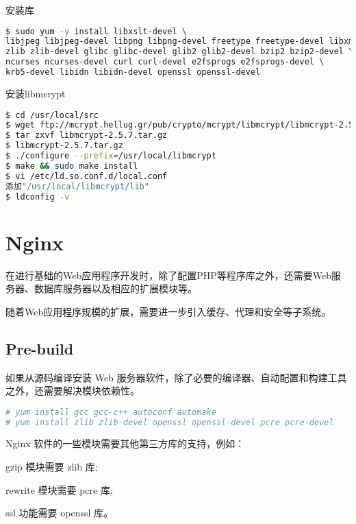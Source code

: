 安装库


\begin{lstlisting}[language=bash]
$ sudo yum -y install libxslt-devel \
libjpeg libjpeg-devel libpng libpng-devel freetype freetype-devel libxml2 libxml2-devel \
zlib zlib-devel glibc glibc-devel glib2 glib2-devel bzip2 bzip2-devel \
ncurses ncurses-devel curl curl-devel e2fsprogs e2fsprogs-devel \
krb5-devel libidn libidn-devel openssl openssl-devel
\end{lstlisting}

安装libmcrypt


\begin{lstlisting}[language=bash]
$ cd /usr/local/src
$ wget ftp://mcrypt.hellug.gr/pub/crypto/mcrypt/libmcrypt/libmcrypt-2.5.7.tar.gz
$ tar zxvf libmcrypt-2.5.7.tar.gz
$ libmcrypt-2.5.7.tar.gz
$ ./configure --prefix=/usr/local/libmcrypt
$ make && sudo make install
$ vi /etc/ld.so.conf.d/local.conf
添加"/usr/local/libmcrypt/lib"
$ ldconfig -v
\end{lstlisting}





\section{Nginx}



在进行基础的Web应用程序开发时，除了配置PHP等程序库之外，还需要Web服务器、数据库服务器以及相应的扩展模块等。

随着Web应用程序规模的扩展，需要进一步引入缓存、代理和安全等子系统。


\subsection{Pre-build}

如果从源码编译安装 Web 服务器软件，除了必要的编译器、自动配置和构建工具之外，还需要解决模块依赖性。


\begin{lstlisting}[language=bash]
# yum install gcc gcc-c++ autoconf automake
# yum install zlib zlib-devel openssl openssl-devel pcre pcre-devel
\end{lstlisting}

Nginx 软件的一些模块需要其他第三方库的支持，例如：

\begin{compactitem}
\item gzip 模块需要 zlib 库;
\item rewrite 模块需要 pcre 库;
\item ssl 功能需要 openssl 库。
\end{compactitem}


